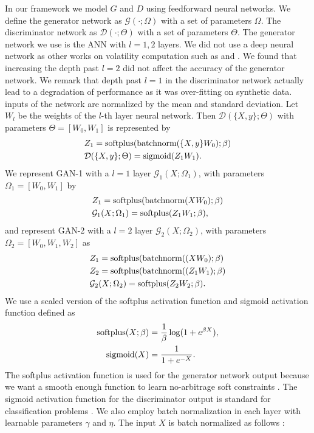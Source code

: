 \documentclass{article}
\theoremstyle{plain}%
\theoremstyle{definition}
\theoremstyle{remark}
\begin{document}
In our framework we model $G$ and $D$ using feedforward neural networks. We define the generator network as $\mathcal{G}(\cdot;\Omega)$ with a set of parameters $\Omega$. The discriminator network as $\mathcal{D}(\cdot;\Theta)$ with a set of parameters $\Theta$.  The generator network we use is the ANN with $l=1,2$ layers. We did not use a deep neural network as other works on volatility computation such as \citep{liu-2019-1} and \citep{chataigner-2020}. We found that increasing the depth past $l=2$ did not affect the accuracy of the generator network. We remark that depth past $l=1$ in the discriminator network actually lead to a degradation of performance as it was over-fitting on synthetic data. inputs of the network are normalized by the mean and standard deviation. Let $W_l$ be the weights of the $l$-th layer neural network. Then $\mathcal{D}(\{X,y\};\Theta)$ with parameters $\Theta = [W_0,W_1]$ is represented by
\begin{align*}
	&Z_1 = \textnormal{softplus}(\textnormal{batchnorm}(\{X,y\} W_0);\beta)\\
    &\mathcal{D}(\{X,y\};\Theta) = \textnormal{sigmoid}(Z_1 W_1).
\end{align*}
We represent GAN-1 with a $l=1$ layer $\mathcal{G}_1(X;\Omega_1)$, with parameters $\Omega_1 = [W_0,W_1]$ by
\begin{align*}
	&Z_1 = \textnormal{softplus}(\textnormal{batchnorm}(X W_0);\beta)\\
    &\mathcal{G}_1(X;\Omega_1) = \textnormal{softplus}(Z_1 W_1;\beta),
\end{align*}
and represent GAN-2 with a $l=2$ layer $\mathcal{G}_2(X;\Omega_2)$, with parameters $\Omega_2 = [W_0,W_1,W_2]$ as
\begin{align*}
	&Z_1 = \textnormal{softplus}(\textnormal{batchnorm}((X W_0);\beta)\\
    &Z_2 = \textnormal{softplus}(\textnormal{batchnorm}((Z_1W_1);\beta)\\
    &\mathcal{G}_2(X;\Omega_2) = \textnormal{softplus}(Z_2 W_2;\beta).
\end{align*}
We use a scaled version of the softplus activation function and sigmoid activation function defined as \citep{dugas-2001, goodfellow-2016}
\begin{align*}
    \textnormal{softplus}(X;\beta) &= \frac{1}{\beta}\log(1+e^{\beta X}),\\
    \textnormal{sigmoid}(X) &= \frac{1}{1+e^{-X}}.
\end{align*}
The softplus activation function is used for the generator network output because we want a smooth enough function to learn no-arbitrage soft constraints \citep{dugas-2001}. The sigmoid activation function for the discriminator output is standard for classification problems \citep{goodfellow-2016}.  We also employ batch normalization in each layer with learnable parameters $\gamma$ and $\eta$. The input $X$ is batch normalized as follows \citep{goodfellow-2016}:
\end{document}

